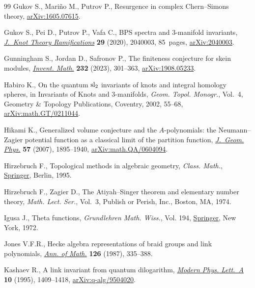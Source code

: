 \documentclass[pdftex]{sigma}
\numberwithin{equation}{section}
\begin{document}
\begin{thebibliography}{99}
Gukov S., Mari\~no M., Putrov P., Resurgence in complex {C}hern--{S}imons
 theory, \href{https://arxiv.org/abs/1605.07615}{arXiv:1605.07615}.

Gukov S., Pei D., Putrov P., Vafa C., B{PS} spectra and 3-manifold invariants,
 \href{https://doi.org/10.1142/S0218216520400039}{\textit{J.~Knot Theory Ramifications}} \textbf{29} (2020), 2040003, 85~pages,
 \href{https://arxiv.org/abs/2040003}{arXiv:2040003}.

Gunningham S., Jordan D., Safronov P., The finiteness conjecture for skein
 modules, \href{https://doi.org/10.1007/s00222-022-01167-0}{\textit{Invent. Math.}} \textbf{232} (2023), 301--363,
 \href{https://arxiv.org/abs/1908.05233}{arXiv:1908.05233}.

Habiro K., On the quantum {$\rm sl_2$} invariants of knots and integral
 homology spheres, in Invariants of {K}nots and 3-manifolds, \textit{Geom.
 Topol. Monogr.}, Vol.~4, Geometry \& Topology Publications, Coventry, 2002,
 55--68, \href{https://arxiv.org/abs/math.GT/0211044}{arXiv:math.GT/0211044}.

Hikami K., Generalized volume conjecture and the {$A$}-polynomials: the
 {N}eumann--{Z}agier potential function as a classical limit of the partition
 function, \href{https://doi.org/10.1016/j.geomphys.2007.03.008}{\textit{J.~Geom. Phys.}} \textbf{57} (2007), 1895--1940,
 \href{https://arxiv.org/abs/math.QA/0604094}{arXiv:math.QA/0604094}.

Hirzebruch F., Topological methods in algebraic geometry, \textit{Class. Math.},
 \href{https://doi.org/10.1007/978-3-642-62018-8}{Springer}, Berlin, 1995.

Hirzebruch F., Zagier D., The {A}tiyah--{S}inger theorem and elementary number
 theory, \textit{Math. Lect. Ser.}, Vol.~3, Publish or Perish, Inc., Boston,
 MA, 1974.

Igusa J., Theta functions, \textit{Grundlehren Math. Wiss.}, Vol. 194,
 \href{https://doi.org/10.1007/978-3-642-65315-5}{Springer}, New York, 1972.

Jones V.F.R., Hecke algebra representations of braid groups and link
 polynomials, \href{https://doi.org/10.2307/1971403}{\textit{Ann. of Math.}} \textbf{126} (1987), 335--388.

Kashaev R., A link invariant from quantum dilogarithm, \href{https://doi.org/10.1142/S0217732395001526}{\textit{Modern Phys.
 Lett.~A}} \textbf{10} (1995), 1409--1418, \href{https://arxiv.org/abs/q-alg/9504020}{arXiv:q-alg/9504020}.


\end{thebibliography}
\end{document}
